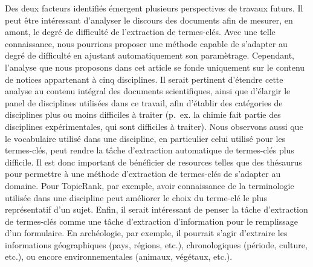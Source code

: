   Des deux facteurs identifiés émergent plusieurs perspectives de travaux
  futurs. Il peut être intéressant d'analyser le discours des documents afin de
  mesurer, en amont, le degré de difficulté de l'extraction de termes-clés. Avec
  une telle connaissance, nous pourrions proposer une méthode capable de
  s'adapter au degré de difficulté en ajustant automatiquement son paramètrage.
  Cependant, l'analyse que nous proposons dans cet article se fonde uniquement
  sur le contenu de notices appartenant à cinq disciplines. Il serait pertinent
  d'étendre cette analyse au contenu intégral des documents scientifiques, ainsi
  que d'élargir le panel de disciplines utilisées dans ce travail, afin
  d'établir des catégories de disciplines plus ou moins difficiles à traiter
  (p.~ex. la chimie fait partie des disciplines expérimentales, qui sont
  difficiles à traiter). Nous observons aussi que le vocabulaire utilisé dans
  une discipline, en particulier celui utilisé pour les termes-clés, peut rendre
  la tâche d'extraction automatique de termes-clés plus difficile. Il est donc
  important de bénéficier de resources telles que des thésaurus pour permettre à
  une méthode d'extraction de termes-clés de s'adapter au domaine. Pour
  TopicRank, par exemple, avoir connaissance de la terminologie utilisée dans
  une discipline peut améliorer le choix du terme-clé le plus représentatif d'un
  sujet. Enfin, il serait intéressant de penser la tâche d'extraction de
  termes-clés comme une tâche d'extraction d'information pour le remplissage
  d'un formulaire. En archéologie, par exemple, il pourrait s'agir d'extraire
  les informations géographiques (pays, régions, etc.), chronologiques (période,
  culture, etc.), ou encore environnementales (animaux, végétaux, etc.).

